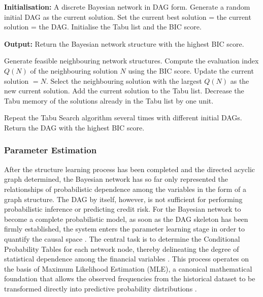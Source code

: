 \vspace{0.5em}
\begin{algorithm}[h]
\caption{Pseudocode of the BIC-based Tabu Search algorithm}
\label{alg:tabu_bic}
\vspace{0.5em}
\textbf{Initialisation:} A discrete Bayesian network in DAG form. 
Generate a random initial DAG as the current solution. 
Set the current best solution = the current solution = the DAG. 
Initialise the Tabu list and the BIC score.

\vspace{0.5cm}

\textbf{Output:} Return the Bayesian network structure with the highest BIC score.

\begin{tcolorbox}
\begin{algorithmic}[1]
    \State Generate feasible neighbouring network structures.
            \State Compute the evaluation index $Q(N)$ of the neighbouring solution $N$ using the BIC score.
                \State Update the current solution $= N$.
            \EndIf
        \EndIf
    \EndFor
    \State Select the neighbouring solution with the largest $Q(N)$ as the new current solution.
    \State Add the current solution to the Tabu list.
    \State Decrease the Tabu memory of the solutions already in the Tabu list by one unit.
\EndWhile

\State Repeat the Tabu Search algorithm several times with different initial DAGs.
\State Return the DAG with the highest BIC score.
\end{algorithmic}
\end{tcolorbox}
\end{algorithm}
\FloatBarrier

\subsubsection{Parameter Estimation}
\noindent
After the structure learning process has been completed and the directed acyclic graph determined, the Bayesian network has so far only represented the relationships of probabilistic dependence among the variables in the form of a graph structure. The DAG by itself, however, is not sufficient for performing probabilistic inference or predicting credit risk. For the Bayesian network to become a complete probabilistic model, as soon as the DAG skeleton has been firmly established, the system enters the parameter learning stage in order to quantify the causal space \cite{darwiche2009modeling}. The central task is to determine the Conditional Probability Tables for each network node, thereby delineating the degree of statistical dependence among the financial variables \cite{jensen2007bayesian}. This process operates on the basis of Maximum Likelihood Estimation (MLE), a canonical mathematical foundation that allows the observed frequencies from the historical dataset to be transformed directly into predictive probability distributions \cite{liu2024credit}.

